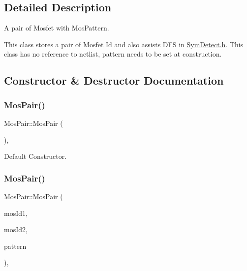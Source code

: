 \subsection{Detailed Description}
A pair of Mosfet with Mos\+Pattern. 

This class stores a pair of Mosfet Id and also assists D\+FS in \hyperlink{SymDetect_8h}{Sym\+Detect.\+h}. This class has no reference to netlist, pattern needs to be set at construction. 

\subsection{Constructor \& Destructor Documentation}
\mbox{\label{classMosPair_ad595508e33836b1645f98d85978375c1}} 
\subsubsection{\texorpdfstring{Mos\+Pair()}{MosPair()}\hspace{0.1cm}{\footnotesize\ttfamily [1/2]}}
{\footnotesize\ttfamily Mos\+Pair\+::\+Mos\+Pair (\begin{DoxyParamCaption}{ }\end{DoxyParamCaption})\hspace{0.3cm}{\ttfamily [explicit]}, {\ttfamily [default]}}



Default Constructor. 

\mbox{\label{classMosPair_a03e4f764099652cbb0a79f7e0392c315}} 
\subsubsection{\texorpdfstring{Mos\+Pair()}{MosPair()}\hspace{0.1cm}{\footnotesize\ttfamily [2/2]}}
{\footnotesize\ttfamily Mos\+Pair\+::\+Mos\+Pair (\begin{DoxyParamCaption}\item[{\hyperlink{type_8h_a581e8093e28e7362f2b6937296190676}{Index\+Type}}]{mos\+Id1,  }\item[{\hyperlink{type_8h_a581e8093e28e7362f2b6937296190676}{Index\+Type}}]{mos\+Id2,  }\item[{\hyperlink{type_8h_af19eddb079bfea723256710b029c38e8}{Mos\+Pattern}}]{pattern }\end{DoxyParamCaption})\hspace{0.3cm}{\ttfamily [inline]}, {\ttfamily [explicit]}}



